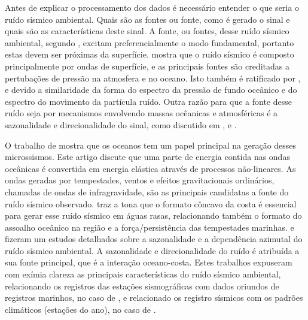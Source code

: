\documentclass[paper,twocolumn]{geophysics}
\begin{document}
Antes de explicar o processamento dos dados é necessário entender o que seria o ruído sísmico ambiental. Quais são as fontes ou fonte, como é gerado o sinal e quais são as características deste sinal. A fonte, ou fontes, desse ruído sísmico ambiental, segundo \cite{rhie_excitation_2004}, excitam preferencialmente o modo fundamental, portanto estas devem ser próximas da superfície. \cite{stehly_study_2006} mostra que o ruído sísmico é composto principalmente por ondas de superfície, e as principais fontes são creditadas a pertubações de pressão na atmosfera e no oceano. Isto também é ratificado por \cite{rhie_excitation_2004}, \cite{schulte-pelkum_strong_2004} e \cite{kedar_oceans_2005} devido a similaridade da forma do espectro da pressão de fundo oceânico e do espectro do movimento da partícula ruído. Outra razão para que a fonte desse ruído seja por mecanismos envolvendo massas ocêanicas e atmosféricas é a sazonalidade e direcionalidade do sinal, como discutido em  \cite{rhie_excitation_2004}, \cite{schulte-pelkum_strong_2004} e \cite{stehly_study_2006}.

O trabalho de \cite{rhie_excitation_2004} mostra que os oceanos tem um papel principal na geração desses microssismos. Este artigo discute que uma parte de energia contida nas ondas oceânicas é convertida em energia elástica através de processos não-lineares. As ondas geradas por tempestades, ventos e efeitos gravitacionais ordinários, chamadas de ondas de infragravidade, são as principais candidatas a fonte do ruído sísmico observado. \cite{rhie_excitation_2004} traz a tona que o formato côncavo da costa é essencial para gerar esse ruído sísmico em águas rasas, relacionando também o formato do assoalho oceânico na região e a força/persistência das tempestades marinhas. \cite{schulte-pelkum_strong_2004} e \cite{stehly_study_2006} fizeram um estudos detalhados sobre a sazonalidade e a dependência azimutal do ruído sísmico ambiental. A sazonalidade e direcionalidade do ruído é atribuída a sua fonte principal, que é a interação oceano-costa. Estes trabalhos expuseram com exímia clareza as principais características do ruído sísmico ambiental, relacionando os registros das estações sismográficas com dados oriundos de registros marinhos, no caso de \cite{schulte-pelkum_strong_2004}, e relacionado os registro sísmicos com os padrões climáticos (estações do ano), no caso de \cite{stehly_study_2006}. 
\end{document}

